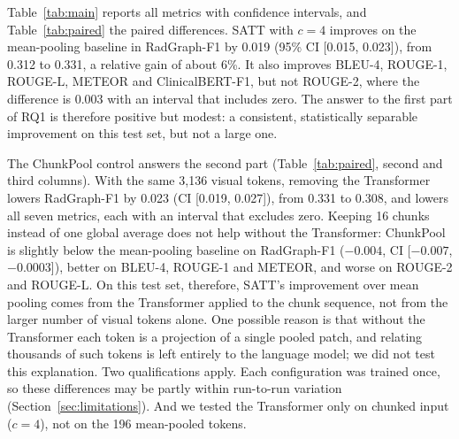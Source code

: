 \documentclass[conference]{IEEEtran}
\begin{document}
Table~\ref{tab:main} reports all metrics with confidence intervals, and
Table~\ref{tab:paired} the paired differences. SATT with $c=4$ improves on
the mean-pooling baseline in RadGraph-F1 by 0.019 (95\% CI [0.015, 0.023]),
from 0.312 to 0.331, a relative gain of about 6\%. It also improves BLEU-4,
ROUGE-1, ROUGE-L, METEOR and ClinicalBERT-F1, but not ROUGE-2, where the
difference is 0.003 with an interval that includes zero. The answer to the
first part of RQ1 is therefore positive but modest: a consistent,
statistically separable improvement on this test set, but not a large one.

The ChunkPool control answers the second part (Table~\ref{tab:paired},
second and third columns). With the same 3,136 visual tokens, removing the
Transformer lowers RadGraph-F1 by 0.023 (CI [0.019, 0.027]), from 0.331 to
0.308, and lowers all seven metrics, each with an interval that excludes
zero. Keeping 16 chunks instead of one global average does not help without
the Transformer: ChunkPool is slightly below the mean-pooling baseline on
RadGraph-F1 ($-0.004$, CI [$-0.007$, $-0.0003$]), better on BLEU-4, ROUGE-1
and METEOR, and worse on ROUGE-2 and ROUGE-L. On this test set, therefore,
SATT's improvement over mean pooling comes from the Transformer applied to
the chunk sequence, not from the larger number of visual tokens alone. One
possible reason is that without the Transformer each token is a projection of
a single pooled patch, and relating thousands of such tokens is left entirely
to the language model; we did not test this explanation. Two qualifications
apply. Each configuration was trained once, so these differences may be
partly within run-to-run variation (Section~\ref{sec:limitations}). And we
tested the Transformer only on chunked input ($c=4$), not on the 196
mean-pooled tokens.
\end{document}
